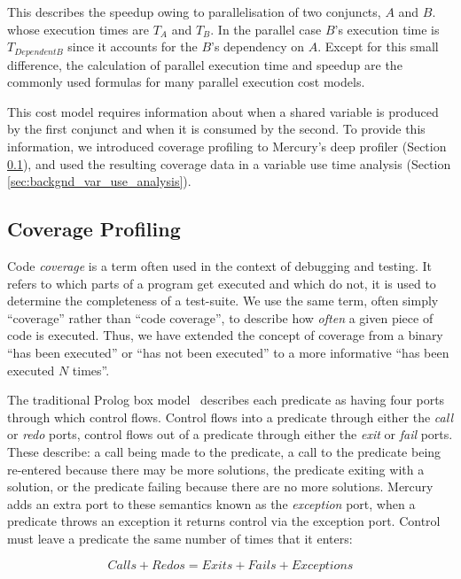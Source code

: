 This describes the speedup owing to parallelisation of two conjuncts, $A$
and $B$.
whose execution times are $T_A$ and $T_B$.
In the parallel case $B$'s execution time is $T_{DependentB}$ since it
accounts for the $B$'s dependency on $A$.
Except for this small difference,
the calculation of parallel execution time and speedup are the commonly
used formulas for many parallel execution cost models.

This cost model requires information about when a shared variable is
produced by the first conjunct and when it is consumed by the second.
To provide this information,
we introduced coverage profiling to Mercury's deep profiler (Section
\ref{sec:backgnd_coverage}),
and used the resulting coverage data in a variable use time analysis
(Section \ref{sec:backgnd_var_use_analysis}).

\subsection{Coverage Profiling}
\label{sec:backgnd_coverage}

Code \emph{coverage} is a term often used in the context of debugging and
testing.
It refers to which parts of a program get executed and which do not,
it is used to determine the completeness of a test-suite.
We use the same term,
often simply ``coverage'' rather than ``code coverage'',
to describe how \emph{often} a given piece of code is executed.
Thus, we have extended the concept of coverage from a binary ``has been
executed'' or ``has not been executed'' to a more informative
``has been executed $N$ times''.

The traditional Prolog box
model~\citep{box-model} describes each predicate
as having four ports through which control flows.
Control flows into a predicate through either the \emph{call} or
\emph{redo} ports,
control flows out of a predicate through either the \emph{exit} or
\emph{fail} ports.
These describe:
    a call being made to the predicate,
    a call to the predicate being re-entered because there may be more
    solutions,
    the predicate exiting with a solution,
    or the predicate failing because there are no more solutions.
Mercury adds an extra port to these semantics known as the
\emph{exception} port,
when a predicate throws an exception it returns control via the exception
port.
Control must leave a predicate the same number of times that it enters:

\begin{equation*}
Calls + Redos = Exits + Fails + Exceptions
\end{equation*}

